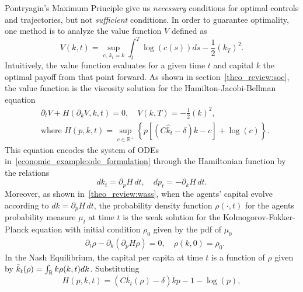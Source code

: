     Pontryagin's Maximum Principle give us \textit{necessary} conditions for optimal controls and trajectories, but not \textit{sufficient} conditions.
    In order to guarantee optimality, one method is to analyze the value function $V$ defined as
\begin{equation}\label{economic_example:value_function_definition}
    V(k,t) = \sup_{c,\, k_t = k} \int_t^T \log(c(s)) ds -\frac{1}{2}{(k_T)}^2.
\end{equation}
Intuitively, the value function evaluates for a given time $t$ and capital $k$ the optimal payoff from that point forward.
As shown in section~\ref{theo_review:soc}, the value function is the viscosity solution for the Hamilton-Jacobi-Bellman equation
\begin{equation}\label{economic_example:hjb_equation_reduced}
    \begin{split}
        &\partial_t V + H(\partial_k V, k,t) = 0,\quad V(k,T) = -\frac{1}{2}{(k)}^2,\\
        &\text{where }
        H(p,k,t) = \sup_{c \in \mathbb{R}^+} \left\{ p\left[ \left(C {\hat k_t - \delta}\right)k - c \right] + \log(c) \right\}.
    \end{split}
\end{equation}
This equation encodes the system of ODEs in~\ref{economic_example:ode_formulation} through the Hamiltonian function by the relations
\begin{equation*}
    d k_t = \partial_p H\, dt ,\quad d p_t = -\partial_k H \, dt.
\end{equation*}
Moreover, as shown in~\ref{theo_review:wass},
when the agents' capital evolve according to $d k = \partial_p H\, dt$,
the probability density function $\rho(\cdot, t)$ for the agents probability measure $\mu_t$ at time $t$
is the weak solution for the Kolmogorov-Fokker-Planck equation with initial condition $\rho_0$ given by the pdf of $\mu_0$
\begin{equation}\label{economic_example:fkp_equation_reduced}
\begin{split}
    &\partial_t \rho - \partial_k \left( \partial_p H \rho \right) = 0, \quad\rho(k,0) = \rho_0.
\end{split}
\end{equation}
In the Nash Equilibrium, the capital per capita at time $t$ is a function of $\rho$ given by $\bar k_t(\rho) = \int_{\mathbb{R}} k \rho(k,t) dk$.
Substituting 
\begin{equation*}
    H(p,k,t) = \left(C {\bar k_t(\rho) - \delta}\right)k p  - 1  - \log(p),
\end{equation*}
